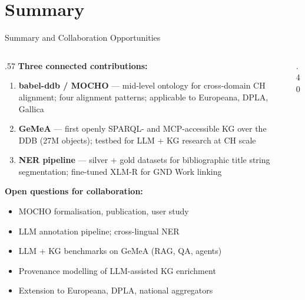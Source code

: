 \documentclass[xcolor,aspectratio=169,compress]{beamer}
\begin{document}
\section{Summary}

\begin{frame}{Summary and Collaboration Opportunities}
  \begin{columns}
    \begin{column}{.57\textwidth}
      \textbf{Three connected contributions:}
      \begin{enumerate}\setlength{\itemsep}{4pt}
        \item \textbf{babel-ddb / MOCHO} --- mid-level ontology for
              cross-domain CH alignment; four alignment patterns;
              applicable to Europeana, DPLA, Gallica
        \item \textbf{GeMeA} --- first openly SPARQL- and
              MCP-accessible KG over the DDB (27M objects);
              testbed for LLM + KG research at CH scale
        \item \textbf{NER pipeline} --- silver + gold datasets for
              bibliographic title string segmentation;
              fine-tuned XLM-R for GND Work linking
      \end{enumerate}
      \medskip
      \textbf{Open questions for collaboration:}
      \begin{itemize}\setlength{\itemsep}{2pt}
        \item MOCHO formalisation, publication, user study
        \item LLM annotation pipeline; cross-lingual NER
        \item LLM + KG benchmarks on GeMeA (RAG, QA, agents)
        \item Provenance modelling of LLM-assisted KG enrichment
        \item Extension to Europeana, DPLA, national aggregators
      \end{itemize}
    \end{column}
    \begin{column}{.40\textwidth}
      \begin{center}
      \end{center}
    \end{column}
  \end{columns}
\end{frame}
\end{document}
